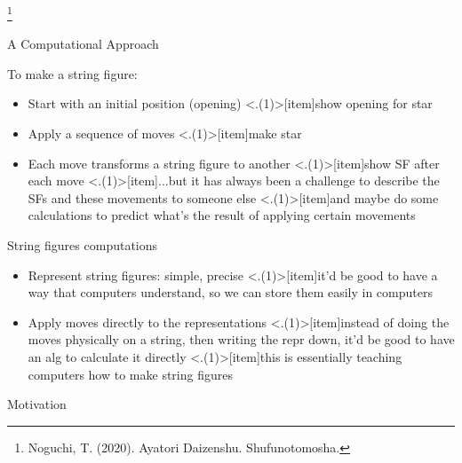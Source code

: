 \begin{frame}{\secname}
\footnote{Noguchi, T. (2020). Ayatori Daizenshu. Shufunotomosha. }

\end{frame}



\begin{frame}{A Computational Approach}


To make a string figure:

\begin{itemize}
    \item Start with an initial position (opening)
    \note<.(1)>[item]{show opening for star}
    \item Apply a sequence of moves
    \note<.(1)>[item]{make star}
    \item Each move transforms a string figure to another
    \note<.(1)>[item]{show SF after each move}
    \note<.(1)>[item]{...but it has always been a challenge to describe the SFs and these movements to someone else}
    \note<.(1)>[item]{and maybe do some calculations to predict what's the result of applying certain movements}
\end{itemize}

String figures computations

\begin{itemize}
    \item Represent string figures: simple, precise
    \note<.(1)>[item]{it'd be good to have a way that computers understand, so we can store them easily in computers}
    \item Apply moves directly to the representations
    \note<.(1)>[item]{instead of doing the moves physically on a string, then writing the repr down, it'd be good to have an alg to calculate it directly}
    \note<.(1)>[item]{this is essentially teaching computers how to make string figures}
\end{itemize}

Motivation


\end{frame}
